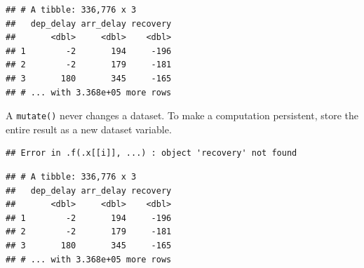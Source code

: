 \documentclass[]{book}
\newenvironment{Shaded}{}{}
\newcommand{\DataTypeTok}[1]{#1}
\newcommand{\KeywordTok}[1]{\textcolor[rgb]{0.00,0.00,1.00}{#1}}
\newcommand{\NormalTok}[1]{#1}
\newcommand{\OperatorTok}[1]{#1}
\newcommand{\StringTok}[1]{\textcolor[rgb]{0.00,0.50,0.50}{#1}}
\begin{document}
\begin{Shaded}
\end{Shaded}

\begin{verbatim}
## # A tibble: 336,776 x 3
##   dep_delay arr_delay recovery
##       <dbl>     <dbl>    <dbl>
## 1        -2       194     -196
## 2        -2       179     -181
## 3       180       345     -165
## # ... with 3.368e+05 more rows
\end{verbatim}

A \texttt{mutate()} never changes a dataset.
To make a computation persistent, store the entire result as a new dataset variable.

\begin{Shaded}
\end{Shaded}

\begin{verbatim}
## Error in .f(.x[[i]], ...) : object 'recovery' not found
\end{verbatim}

\begin{Shaded}
\end{Shaded}

\begin{verbatim}
## # A tibble: 336,776 x 3
##   dep_delay arr_delay recovery
##       <dbl>     <dbl>    <dbl>
## 1        -2       194     -196
## 2        -2       179     -181
## 3       180       345     -165
## # ... with 3.368e+05 more rows
\end{verbatim}
\end{document}
